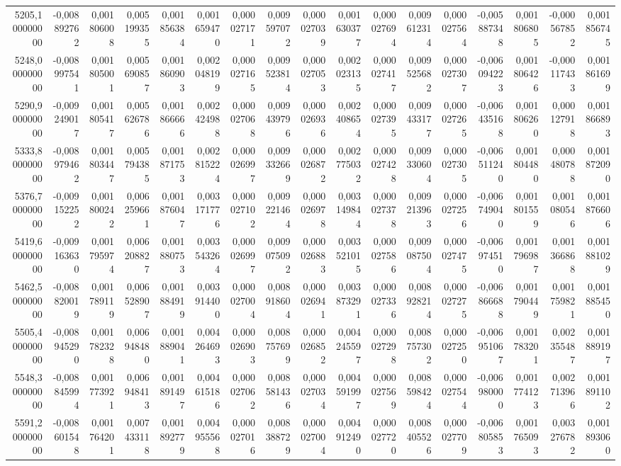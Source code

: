 \begin{longtable}{rrrrrrrrrrrrrrrrr}
5205,100000000 & -0,008892762 & 0,001806008 & 0,005199355 & 0,001856384 & 0,001659470 & 0,000027171 & 0,009597072 & 0,000027039 & 0,001630377 & 0,000027694 & 0,009612314 & 0,000027564 & -0,005887348 & 0,001806805 & -0,000567852 & 0,001856745\\
5248,000000000 & -0,008997541 & 0,001805001 & 0,005690857 & 0,001860903 & 0,002048199 & 0,000027165 & 0,009523814 & 0,000027053 & 0,002023135 & 0,000027417 & 0,009525682 & 0,000027307 & -0,006094223 & 0,001806426 & -0,000117433 & 0,001861699\\
5290,900000000 & -0,009249017 & 0,001805417 & 0,005626786 & 0,001866666 & 0,002424988 & 0,000027068 & 0,009439796 & 0,000026936 & 0,002408654 & 0,000027395 & 0,009433177 & 0,000027265 & -0,006435168 & 0,001806260 & 0,000127918 & 0,001866893\\
5333,800000000 & -0,008979462 & 0,001803447 & 0,005794385 & 0,001871753 & 0,002815224 & 0,000026997 & 0,009332669 & 0,000026872 & 0,002775032 & 0,000027428 & 0,009330604 & 0,000027305 & -0,006511240 & 0,001804480 & 0,000480788 & 0,001872090\\
5376,700000000 & -0,009152252 & 0,001800242 & 0,006259661 & 0,001876047 & 0,003171776 & 0,000027102 & 0,009221464 & 0,000026978 & 0,003149844 & 0,000027378 & 0,009213963 & 0,000027256 & -0,006749040 & 0,001801559 & 0,001080546 & 0,001876606\\
5419,600000000 & -0,009163630 & 0,001795974 & 0,006208827 & 0,001880753 & 0,003543264 & 0,000026997 & 0,009075092 & 0,000026883 & 0,003521015 & 0,000027586 & 0,009087504 & 0,000027475 & -0,006974510 & 0,001796987 & 0,001366868 & 0,001881029\\
5462,500000000 & -0,008820019 & 0,001789119 & 0,006528907 & 0,001884919 & 0,003914400 & 0,000027004 & 0,008918604 & 0,000026941 & 0,003873291 & 0,000027336 & 0,008928214 & 0,000027275 & -0,006866688 & 0,001790449 & 0,001759821 & 0,001885450\\
5505,400000000 & -0,008945290 & 0,001782328 & 0,006948480 & 0,001889041 & 0,004264693 & 0,000026903 & 0,008757699 & 0,000026852 & 0,004245597 & 0,000027298 & 0,008757302 & 0,000027250 & -0,006951067 & 0,001783201 & 0,002355487 & 0,001889197\\
5548,300000000 & -0,008845994 & 0,001773921 & 0,006948413 & 0,001891497 & 0,004615186 & 0,000027062 & 0,008581436 & 0,000027034 & 0,004591997 & 0,000027569 & 0,008598424 & 0,000027544 & -0,006980000 & 0,001774123 & 0,002713966 & 0,001891102\\
5591,200000000 & -0,008601548 & 0,001764201 & 0,007433118 & 0,001892779 & 0,004955568 & 0,000027016 & 0,008388729 & 0,000027004 & 0,004912490 & 0,000027720 & 0,008405526 & 0,000027709 & -0,006805853 & 0,001765093 & 0,003276782 & 0,001893060\\

\end{longtable}
